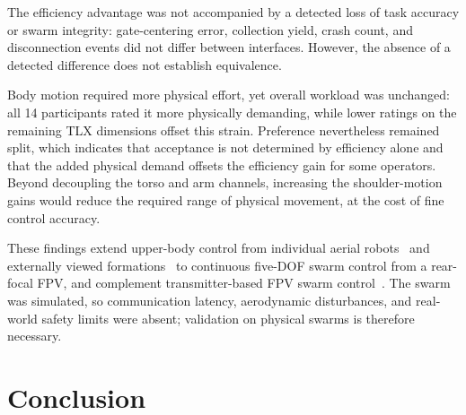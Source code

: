 \documentclass[a4paper,10pt,conference]{ieeeconf}
\begin{document}
The efficiency advantage was not accompanied by a detected loss of task accuracy
or swarm integrity: gate-centering error, collection yield, crash count, and
disconnection events did not differ between interfaces. However, the absence of
a detected difference does not establish equivalence.

Body motion required more physical effort, yet overall workload was unchanged:
all 14 participants rated it more physically demanding, while lower ratings on
the remaining TLX dimensions offset this strain. Preference nevertheless
remained split, which indicates that acceptance is not determined by efficiency
alone and that the added physical demand offsets the efficiency gain for some
operators. Beyond decoupling the torso and arm channels, increasing the
shoulder-motion gains would reduce the required range of physical movement, at
the cost of fine control accuracy.

These findings extend upper-body control from individual aerial
robots~\cite{rognon2018flyjacket,miehlbradt2018datadriven,macchini2024datadriven}
and externally viewed
formations~\cite{macchini2021personalized,tsykunov2019swarmtouch,kratky2025gesture}
to continuous five-DOF swarm control from a rear-focal FPV, and complement
transmitter-based FPV swarm control~\cite{ben_focaldrone}. The swarm was
simulated, so communication latency, aerodynamic disturbances, and real-world
safety limits were absent; validation on physical swarms is therefore necessary.


\section{Conclusion}


\end{document}
